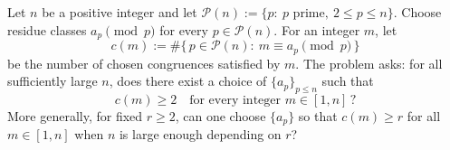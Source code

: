 Let $n$ be a positive integer and let $\mathcal P(n):=\{p:\ p\text{ prime},\ 2\le p\le n\}$.
Choose residue classes $a_p\pmod p$ for every $p\in\mathcal P(n)$.
For an integer $m$, let
\[
c(m):=\#\{\,p\in\mathcal P(n):\ m\equiv a_p\pmod p\,\}
\]
be the number of chosen congruences satisfied by $m$.
The problem asks: for all sufficiently large $n$, does there exist a choice of $\{a_p\}_{p\le n}$ such that
\[
c(m)\ge 2 \quad\text{for every integer }m\in[1,n]\,?
\]
More generally, for fixed $r\ge 2$, can one choose $\{a_p\}$ so that $c(m)\ge r$ for all $m\in[1,n]$ when $n$ is large enough depending on $r$?
